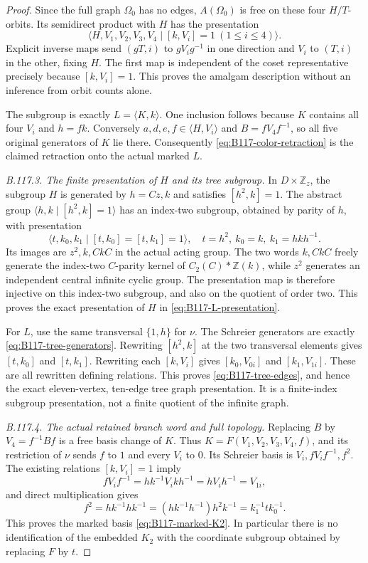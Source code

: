 \begin{proof}
Since the full graph $\Omega_0$ has no edges,
$A(\Omega_0)$ is free on these four $H/T$-orbits. Its semidirect
product with $H$ has the presentation
\[
 \langle H,V_1,V_2,V_3,V_4\mid[k,V_i]=1\ (1\leq i\leq4)\rangle.
\]
Explicit inverse maps send $(gT,i)$ to $gV_i g^{-1}$ in one
direction and $V_i$ to $(T,i)$ in the other, fixing $H$.
The first map is independent of the coset representative precisely
because $[k,V_i]=1$. This proves the amalgam description without
an inference from orbit counts alone.

The subgroup is exactly $L=\langle K,k\rangle$. One inclusion
follows because $K$ contains all four $V_i$ and $h=fk$.
Conversely $a,d,e,f\in\langle H,V_i\rangle$ and
$B=fV_4f^{-1}$, so all five original generators of $K$ lie there.
Consequently \eqref{eq:B117-color-retraction} is the claimed
retraction onto the actual marked $L$.

\emph{B.117.3. The finite presentation of $H$ and its tree subgroup.}
In $D\times\mathbb Z_z$, the subgroup $H$ is generated by
$h=Cz,k$ and satisfies $[h^2,k]=1$.
The abstract group $\langle h,k\mid[h^2,k]=1\rangle$ has an
index-two subgroup, obtained by parity of $h$, with presentation
\[
 \langle t,k_0,k_1\mid[t,k_0]=[t,k_1]=1\rangle,
 \quad t=h^2,\ k_0=k,\ k_1=hkh^{-1}.
\]
Its images are $z^2,k,CkC$ in the actual acting group. The two
words $k,CkC$ freely generate the index-two $C$-parity kernel of
$C_2(C)*\mathbb Z(k)$, while $z^2$ generates an independent
central infinite cyclic group. The presentation map is therefore
injective on this index-two subgroup, and also on the quotient of
order two. This proves the exact presentation of $H$ in
\eqref{eq:B117-L-presentation}.

For $L$, use the same transversal $\{1,h\}$ for $\nu$.
The Schreier generators are exactly
\eqref{eq:B117-tree-generators}. Rewriting $[h^2,k]$ at the two
transversal elements gives $[t,k_0]$ and $[t,k_1]$.
Rewriting each $[k,V_i]$ gives $[k_0,V_{0i}]$ and
$[k_1,V_{1i}]$. These are all rewritten defining relations.
This proves \eqref{eq:B117-tree-edges}, and hence the exact
eleven-vertex, ten-edge tree graph presentation. It is a finite-index
subgroup presentation, not a finite quotient of the infinite graph.

\emph{B.117.4. The actual retained branch word and full topology.}
Replacing $B$ by $V_4=f^{-1}Bf$ is a free basis change of $K$.
Thus $K=F(V_1,V_2,V_3,V_4,f)$, and its restriction of $\nu$ sends
$f$ to $1$ and every $V_i$ to $0$. Its Schreier basis is
$V_i,fV_i f^{-1},f^2$. The existing relations $[k,V_i]=1$ imply
\[
 fV_i f^{-1}=hk^{-1}V_i kh^{-1}=hV_i h^{-1}=V_{1i},
\]
and direct multiplication gives
\[
 f^2=hk^{-1}hk^{-1}
     =(hk^{-1}h^{-1})h^2k^{-1}=k_1^{-1}t k_0^{-1}.
\]
This proves the marked basis \eqref{eq:B117-marked-K2}.
In particular there is no identification of the embedded $K_2$
with the coordinate subgroup obtained by replacing $F$ by $t$.


\end{proof}

